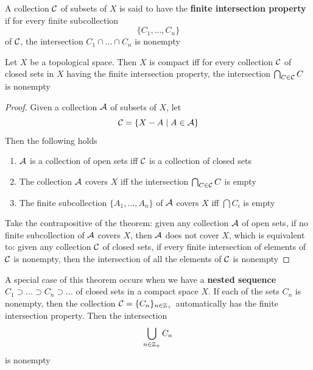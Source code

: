 \documentclass[11pt]{article}
\begin{document}
\begin{definition}[]
A collection \(\mathcal{C}\)  of subsets of \(X\) is said to have the \textbf{finite intersection property} if for
every finite subcollection
\begin{equation*}
\{C_1,\dots,C_n\}
\end{equation*}
of \(\mathcal{C}\), the intersection \(C_1\cap\dots\cap C_n\) is nonempty
\end{definition}

\begin{theorem}[]
Let \(X\) be a topological space. Then \(X\) is compact iff for every collection \(\mathcal{C}\) of closed
sets in \(X\) having the finite intersection property, the intersection \(\bigcap_{C\in\mathcal{C}}C\) is nonempty
\end{theorem}

\begin{proof}
Given a collection \(\mathcal{A}\) of subsets of \(X\), let
\begin{equation*}
\mathcal{C}=\{X-A\mid A\in\mathcal{A}\}
\end{equation*}
Then the following holds
\begin{enumerate}
\item \(\mathcal{A}\) is a collection of open sets iff \(\mathcal{C}\) is a collection of closed sets
\item The collection \(\mathcal{A}\) covers \(X\) iff the intersection \(\bigcap_{C\in\mathcal{C}}C\) is empty
\item The finite subcollection \(\{A_1,\dots,A_n\}\) of \(\mathcal{A}\) covers \(X\) iff \(\bigcap C_i\) is empty
\end{enumerate}


Take the contrapositive of the theorem: given any collection \(\mathcal{A}\) of open sets, if no finite
subcollection of \(\mathcal{A}\) covers \(X\), then \(\mathcal{A}\) does not cover \(X\), which is equivalent to:
given any collection \(\mathcal{C}\) of closed sets, if every finite intersection of elements of \(\mathcal{C}\) is
nonempty, then the intersection of all the elements of \(\mathcal{C}\) is nonempty
\end{proof}

A special case of this theorem occurs when we have a \textbf{nested sequence} \(C_1\supset\dots\supset C_n\supset\dots\) of closed
sets in a compact space \(X\). If each of the sets \(C_n\) is nonempty, then the
collection \(\mathcal{C}=\{C_n\}_{n\in\mathbb{Z}_+}\) automatically has the finite intersection property. Then the
intersection
\begin{equation*}
\bigcup_{n\in\mathbb{Z}_+}C_n
\end{equation*}
is nonempty
\end{document}
